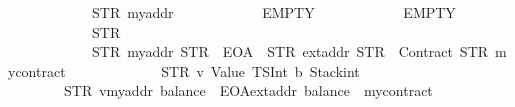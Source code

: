 \begin{isabellebody}
\ \ \ \ \ \ \ \ \ \ \ \ {\isacharparenleft}{\kern0pt}STR\ {\isacharprime}{\kern0pt}{\isacharprime}{\kern0pt}myaddr{\isacharprime}{\kern0pt}{\isacharprime}{\kern0pt}{\isacharparenright}{\kern0pt}\isanewline
\ \ \ \ \ \ \ \ \ \ \ \ EMPTY\isanewline
\ \ \ \ \ \ \ \ \ \ \ \ EMPTY\isanewline
\ \ \ \ \ \ \ \ \ \ \ \ {\isacharparenleft}{\kern0pt}STR\ {\isacharprime}{\kern0pt}{\isacharprime}{\kern0pt}{}{\isacharprime}{\kern0pt}{\isacharprime}{\kern0pt}{\isacharparenright}{\kern0pt}\isanewline
\ \ \ \ \ \ \ \ \ \ \ \ {\isacharbrackleft}{\kern0pt}{\isacharparenleft}{\kern0pt}STR\ {\isacharprime}{\kern0pt}{\isacharprime}{\kern0pt}myaddr{\isacharprime}{\kern0pt}{\isacharprime}{\kern0pt}{\isacharcomma}{\kern0pt}\ STR\ {\isacharprime}{\kern0pt}{\isacharprime}{\kern0pt}{}{}{}{\isacharprime}{\kern0pt}{\isacharprime}{\kern0pt}{\isacharcomma}{\kern0pt}\ EOA{\isacharcomma}{\kern0pt}\ {}{\isacharparenright}{\kern0pt}{\isacharcomma}{\kern0pt}\ {\isacharparenleft}{\kern0pt}STR\ {\isacharprime}{\kern0pt}{\isacharprime}{\kern0pt}extaddr{\isacharprime}{\kern0pt}{\isacharprime}{\kern0pt}{\isacharcomma}{\kern0pt}\ STR\ {\isacharprime}{\kern0pt}{\isacharprime}{\kern0pt}{}{}{}{\isacharprime}{\kern0pt}{\isacharprime}{\kern0pt}{\isacharcomma}{\kern0pt}\ Contract\ {\isacharparenleft}{\kern0pt}STR\ {\isacharprime}{\kern0pt}{\isacharprime}{\kern0pt}mycontract{\isacharprime}{\kern0pt}{\isacharprime}{\kern0pt}{\isacharparenright}{\kern0pt}{\isacharcomma}{\kern0pt}\ {}{\isacharparenright}{\kern0pt}{\isacharbrackright}{\kern0pt}\isanewline
\ \ \ \ \ \ \ \ \ \ \ \ {\isacharbrackleft}{\kern0pt}{\isacharparenleft}{\kern0pt}STR\ {\isacharprime}{\kern0pt}{\isacharprime}{\kern0pt}v{}{\isacharprime}{\kern0pt}{\isacharprime}{\kern0pt}{\isacharcomma}{\kern0pt}\ {\isacharparenleft}{\kern0pt}Value\ {\isacharparenleft}{\kern0pt}TSInt\ b{}{\isacharparenright}{\kern0pt}{\isacharcomma}{\kern0pt}\ Stackint\ {}{\isacharparenright}{\kern0pt}{\isacharparenright}{\kern0pt}{\isacharbrackright}{\kern0pt}\isanewline
\ \ \ \ \ \ \ {\isacharequal}{\kern0pt}\ STR\ {\isacharprime}{\kern0pt}{\isacharprime}{\kern0pt}v{}{\isacharequal}{\kern0pt}{\isacharequal}{\kern0pt}{}{\isasymnewline}myaddr{\isacharcolon}{\kern0pt}\ balance{\isacharequal}{\kern0pt}{\isacharequal}{\kern0pt}{}{}{}\ {\isacharminus}{\kern0pt}\ EOA{\isasymnewline}extaddr{\isacharcolon}{\kern0pt}\ balance{\isacharequal}{\kern0pt}{\isacharequal}{\kern0pt}{}{}{}\ {\isacharminus}{\kern0pt}\ mycontract{\isacharparenleft}{\kern0pt}{\isacharparenright}{\kern0pt}{\isacharprime}{\kern0pt}{\isacharprime}{\kern0pt}{\isachardoublequoteclose}\isanewline

\end{isabellebody}

